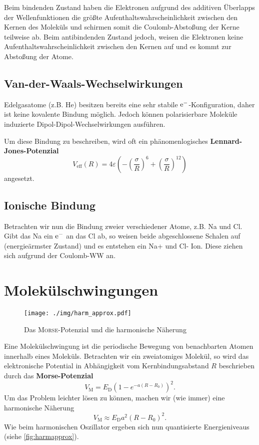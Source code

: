 Beim bindenden Zustand haben die Elektronen aufgrund des additiven Überlapps der Wellenfunktionen die größte Aufenthaltswahrscheinlichkeit zwischen den Kernen des Moleküls und schirmen somit die Coulomb-Abstoßung der Kerne teilweise ab.
Beim antibindenden Zustand jedoch, weisen die Elektronen keine Aufenthaltswahrscheinlichkeit zwischen den Kernen auf und es kommt zur Abstoßung der Atome.

\subsection{Van-der-Waals-Wechselwirkungen}
Edelgasatome (z.B. He) besitzen bereits eine sehr stabile $\text{e}^-$-Konfiguration, daher ist keine kovalente Bindung möglich.
Jedoch können polarisierbare Moleküle induzierte Dipol-Dipol-Wechselwirkungen ausführen.

Um diese Bindung zu beschreiben, wird oft ein phänomenlogisches \textbf{Lennard-Jones-Potenzial}
\begin{equation*}
	V_\text{eff}(R) = 4\varepsilon\left( -\left(\frac{\sigma}{R}\right)^6 + \left(\frac{\sigma}{R}\right)^{12}\right)
\end{equation*}
angesetzt.

\subsection{Ionische Bindung}
Betrachten wir nun die Bindung zweier verschiedener Atome, z.B. Na und Cl.
Gibt das Na ein $\text{e}^-$ an das Cl ab, so weisen beide abgeschlossene Schalen auf (energieärmster Zustand) und es entstehen ein Na+ und Cl- Ion.
Diese ziehen sich aufgrund der Coulomb-WW an.

\section{Molekülschwingungen}
\begin{figure}
	\centering
	\texttt{[image: ./img/harm\_approx.pdf]}
	\caption{Das \textsc{Morse}-Potenzial und die harmonische Näherung}
	\label{fig:harmapprox}
\end{figure}
Eine Molekülschwingung ist die periodische Bewegung von benachbarten Atomen innerhalb eines Moleküls.
Betrachten wir ein zweiatomiges Molekül, so wird das elektronische Potential in Abhängigkeit vom Kernbindungsabstand $R$ beschrieben durch das \textbf{Morse-Potenzial}
\begin{equation*}
	V_\text{M} = E_\text{D}\left(1 - e^{-a(R-R_0)}\right)^2.
\end{equation*}
Um das Problem leichter lösen zu können, machen wir (wie immer) eine harmonische Näherung
\begin{equation*}
	V_\text{M} \approx E_\text{D}a^2\left(R-R_0\right)^2.
\end{equation*}
Wie beim harmonischen Oszillator ergeben sich nun quantisierte Energieniveaus (siehe \autoref{fig:harmapprox}).

